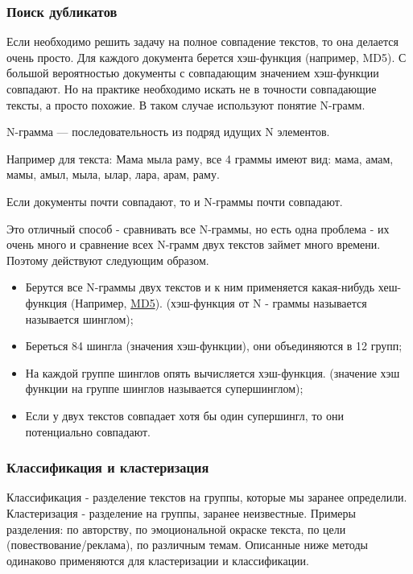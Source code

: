 \subsubsection {Поиск дубликатов}
Если необходимо решить задачу на полное совпадение текстов, то она делается очень просто. Для каждого документа берется хэш-функция (например, MD5). С большой вероятностью документы с совпадающим значением хэш-функции совпадают. Но на практике необходимо искать не в точности совпадающие тексты, а просто похожие. В таком случае используют понятие N-грамм.  \\
\begin{defn} N-грамма — последовательность из подряд идущих N элементов. \end{defn}
Например для текста: Мама мыла раму, все 4 граммы имеют вид: мама, амам, мамы, амыл, мыла, ылар, лара, арам, раму.  \\
\begin{theorem}
Если документы почти совпадают, то и N-граммы почти совпадают.
\end{theorem}
Это отличный способ - сравнивать все N-граммы, но есть одна проблема - их очень много и сравнение всех N-грамм двух текстов займет много времени. Поэтому действуют следующим образом.

\begin {itemize}
\item Берутся все N-граммы двух текстов и к ним применяется какая-нибудь хеш-функция (Например, \href{https://clck.ru/9cRa4}{MD5}). (хэш-функция от N - граммы называется называется шинглом);
\item Береться 84 шингла (значения хэш-функции), они объединяются в 12 групп;
\item На каждой группе шинглов опять вычисляется хэш-функция. (значение хэш функции на группе шинглов называется супершинглом);
\item Если у двух текстов совпадает хотя бы один супершингл,  то они потенциально совпадают.
\end {itemize}

\subsubsection {Классификация и кластеризация}
Классификация - разделение текстов на группы, которые мы заранее определили. Кластеризация - разделение на группы, заранее неизвестные.
Примеры разделения: по авторству, по эмоциональной окраске текста, по цели (повествование/реклама), по различным темам.
Описанные ниже методы одинаково применяются для кластеризации и классификации.

